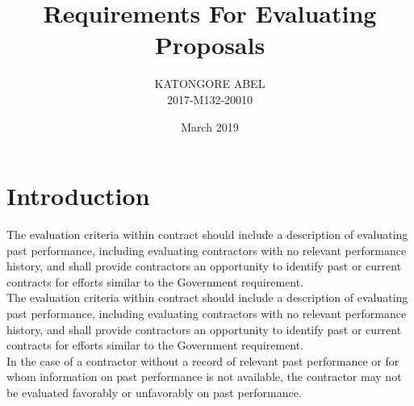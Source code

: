 \documentclass[12pt]{article}
\title{Requirements For Evaluating Proposals}
\author{KATONGORE ABEL\\ 2017-M132-20010 }
\date{March 2019}
\begin{document}
\maketitle

\section{Introduction}
The evaluation criteria within contract should include a description of evaluating past performance, including evaluating contractors with no relevant performance history, and shall provide contractors an opportunity to identify past or current contracts for efforts similar to the Government requirement.\\The evaluation criteria within contract should include a description of evaluating past performance, including evaluating contractors with no relevant performance history, and shall provide contractors an opportunity to identify past or current contracts for efforts similar to the Government requirement.\\In the case of a contractor without a record of relevant past performance or for whom information on past performance is not available, the contractor may not be evaluated favorably or unfavorably on past performance.
\end{document}
